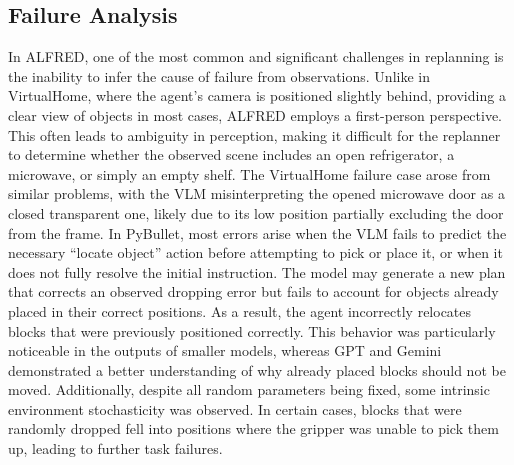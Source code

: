 \documentclass[letterpaper, 10 pt, conference]{ieeeconf}  %
\begin{document}
\subsection{Failure Analysis}
In ALFRED, one of the most common and significant challenges in replanning is the inability to infer the cause of failure from observations. Unlike in VirtualHome, where the agent’s camera is positioned slightly behind, providing a clear view of objects in most cases, ALFRED employs a first-person perspective. This often leads to ambiguity in perception, making it difficult for the replanner to determine whether the observed scene includes an open refrigerator, a microwave, or simply an empty shelf. The VirtualHome failure case arose from similar problems, with the VLM misinterpreting the opened microwave door as a closed transparent one, likely due to its low position partially excluding the door from the frame. In PyBullet, most errors arise when the VLM fails to predict the necessary ``locate object'' action before attempting to pick or place it, or when it does not fully resolve the initial instruction. The model may generate a new plan that corrects an observed dropping error but fails to account for objects already placed in their correct positions. As a result, the agent incorrectly relocates blocks that were previously positioned correctly. This behavior was particularly noticeable in the outputs of smaller models, whereas GPT and Gemini demonstrated a better understanding of why already placed blocks should not be moved.
Additionally, despite all random parameters being fixed, some intrinsic environment stochasticity was observed. In certain cases, blocks that were randomly dropped fell into positions where the gripper was unable to pick them up, leading to further task failures.
\end{document}
